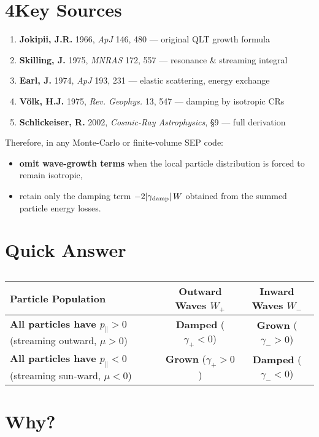 \section*{4\quad Key Sources}

\begin{enumerate}
\item \textbf{Jokipii, J.R.} 1966, \textit{ApJ} 146, 480 — original QLT growth formula
\item \textbf{Skilling, J.} 1975, \textit{MNRAS} 172, 557 — resonance \& streaming integral
\item \textbf{Earl, J.} 1974, \textit{ApJ} 193, 231 — elastic scattering, energy exchange
\item \textbf{Völk, H.J.} 1975, \textit{Rev. Geophys.} 13, 547 — damping by isotropic CRs
\item \textbf{Schlickeiser, R.} 2002, \textit{Cosmic-Ray Astrophysics}, §9 — full derivation
\end{enumerate}

\noindent Therefore, in any Monte-Carlo or finite-volume SEP code:
\begin{itemize}
\item \textbf{omit wave-growth terms} when the local particle distribution is forced to remain isotropic,
\item retain only the damping term $-2|\gamma_{\rm damp}|\,W$ obtained from the summed particle energy losses.
\end{itemize}


\section*{Quick Answer}

\begin{table}[h!]
\centering
\begin{tabular}{|p{6cm}|c|c|}
\hline
\textbf{Particle Population} & Outward Waves $W_{+}$ & Inward Waves $W_{-}$ \\
\hline
\textbf{All particles have $p_\parallel>0$} (streaming outward, $\mu>0$) & \textbf{Damped} ($\gamma_{+}<0$) & \textbf{Grown} ($\gamma_{-}>0$) \\
\hline
\textbf{All particles have $p_\parallel<0$} (streaming sun-ward, $\mu<0$) & \textbf{Grown} ($\gamma_{+}>0$) & \textbf{Damped} ($\gamma_{-}<0$) \\
\hline
\end{tabular}
\caption*{}
\end{table}

\section*{Why?}

